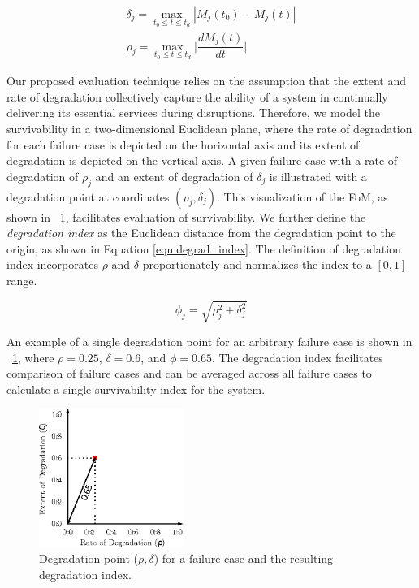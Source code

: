 \documentclass[review]{elsarticle}
\begin{document}
\begin{eqnarray}
\label{eqn:extent}
\delta_j = \max_{t_0 \leq t \leq t_d} |M_j(t_0) - M_j(t)|\\
\label{eqn:rate}
\rho_j = \max_{t_0 \leq t \leq t_d}\Big|\dfrac{dM_j(t)}{dt}\Big|
\end{eqnarray}

Our proposed evaluation technique relies on the assumption that the extent and rate of degradation collectively capture the ability of a system in continually delivering its essential services during disruptions. Therefore, we model the survivability in a two-dimensional Euclidean plane, where the rate of degradation for each failure case is depicted on the horizontal axis and its extent of degradation is depicted on the vertical axis. A given failure case with a rate of degradation of $\rho_j$ and an extent of degradation of $\delta_j$ is illustrated with a degradation point at coordinates $(\rho_j, \delta_j)$. This visualization of the FoM, as shown in \figurename~\ref{fig:degrad_pt}, facilitates evaluation of survivability. We further define the \emph{degradation index} as the Euclidean distance from the degradation point to the origin, as shown in Equation \eqref{eqn:degrad_index}. The definition of degradation index incorporates $\rho$ and $\delta$ proportionately and normalizes the index to a $[0, 1]$ range.

\begin{equation}
\label{eqn:degrad_index}
\phi_j = \sqrt{\rho_j^2 + \delta_j^2}
\end{equation}

An example of a single degradation point for an arbitrary failure case is shown in \figurename~\ref{fig:degrad_pt}, where $\rho = 0.25$, $\delta = 0.6$, and $\phi = 0.65$. The degradation index facilitates comparison of failure cases and can be averaged across all failure cases to calculate a single survivability index for the system.

\begin{figure}[!ht]
\centering
\includegraphics[width=1.85in]{degrad_pt}
\caption{Degradation point ($\rho, \delta$) for a failure case and the resulting degradation index.}
\label{fig:degrad_pt}
\end{figure}
\end{document}
